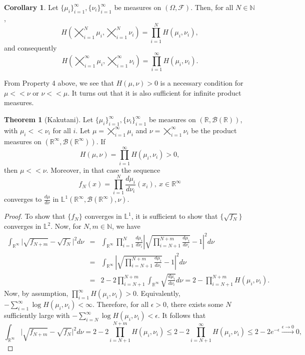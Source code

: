 \documentclass[10pt, a4paper]{report}
\newcommand{\Ll}[0]{\mathbb{L}}
\newcommand{\R}[0]{\mathbb{R}}
\theoremstyle{definition}
\newtheorem{theorem}{Theorem}
\newtheorem{coro}{Corollary}
\theoremstyle{remark}
\begin{document}
\begin{coro}
	Let $\{\mu_i \}_{i=1}^\infty, \{\nu_i \}_{i=1}^\infty$ be measures on $(\Omega,\mathcal{F})$. Then, for all $N \in \mathbb{N}$,
	$$H\left(\bigtimes_{i=1}^N \mu_i, \bigtimes_{i=1}^N \nu_i\right) = \prod_{i=1}^{N}H(\mu_i,\nu_i),$$
	and consequently
	$$H\left(\bigtimes_{i=1}^\infty \mu_i, \bigtimes_{i=1}^\infty \nu_i\right) = \prod_{i=1}^{\infty}H(\mu_i,\nu_i).$$
\end{coro}
From Property 4 above, we see that $H(\mu,\nu)>0$ is a necessary condition for $\mu << \nu$ or $\nu << \mu$. It turns out that it is also sufficient for infinite product measures. 
\begin{theorem}[Kakutani]\label{kakutani}
	Let $\{\mu_i \}_{i=1}^\infty, \{\nu_i \}_{i=1}^\infty$ be measures on $(\R,\mathcal{B}(\R))$, with $
	\mu_i << \nu_i$ for all $i$. Let $\mu = \bigtimes_{i=1}^\infty \mu_i$ and $\nu = \bigtimes_{i=1}^\infty \nu_i$ be the product measures on $(\R^\infty, \mathcal{B}(\R^\infty))$. If 
	$$H(\mu,\nu) = \prod_{i=1}^{\infty}H(\mu_i,\nu_i) > 0,$$
	then $\mu << \nu$. Moreover, in that case the sequence 
	$$f_N(x) = \prod_{i=1}^{N}\frac{d\mu_i}{d\nu_i}(x_i), \ x \in \R^\infty$$
	converges to $\frac{d\mu}{d\nu}$ in $\Ll^1(\R^\infty, \mathcal{B}(\R^\infty),\nu)$.
	\begin{proof}
		To show that $\{f_N\}$ converges in $\Ll^1$, it is sufficient to show that $\{\sqrt{f_N}\}$ converges in $\Ll^2$. Now, for $N,m \in \mathbb{N}$, we have 
		\begin{eqnarray*}
			\int_{\R^\infty} \vert \sqrt{f_{N+m}}-\sqrt{f_{N}} \vert^2 d\nu & = & \int_{\R^\infty} \prod_{i=1}^N \frac{d\mu_i}{d\nu_i} \left\vert \sqrt{\prod_{i=N+1}^{N+m}\frac{d\mu_i}{d\nu_i}}-1 \right\vert^2 d\nu \\
			& = & \int_{\R^\infty} \left\vert \sqrt{\prod_{i=N+1}^{N+m}\frac{d\mu_i}{d\nu_i}}-1 \right\vert^2 d\nu \\
			& = & 2 - 2\prod_{i=N+1}^{N+m}\int_{\R^\infty} \sqrt{\frac{d\mu_i}{d\nu_i}} d\nu = 2-\prod_{i=N+1}^{N+m}H(\mu_i,\nu_i).
		\end{eqnarray*}
		Now, by assumption, $\prod_{i=1}^{\infty}H(\mu_i,\nu_i) > 0$. Equivalently, $-\sum_{i=1}^{\infty}\log H(\mu_i,\nu_i) < \infty$. Therefore, for all $\epsilon>0$, there exists some $N$ sufficiently large with $-\sum_{i=N}^{\infty}\log H(\mu_i,\nu_i) < \epsilon$. It follows that 
		$$\int_{\R^\infty} \vert \sqrt{f_{N+m}}-\sqrt{f_{N}} \vert^2 d\nu = 2-2\prod_{i=N+1}^{N+m}H(\mu_i,\nu_i) \leq 2-2\prod_{i=N+1}^{\infty}H(\mu_i,\nu_i) \leq 2-2e^{-\epsilon} \stackrel{\epsilon\to 0}{\longrightarrow} 0,$$

\end{proof}
\end{theorem}
\end{document}
